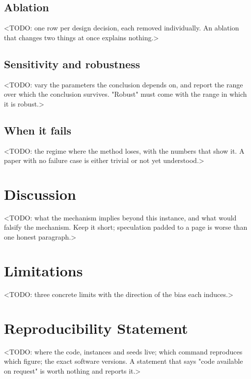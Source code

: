 \documentclass[10pt]{article}
\begin{document}
\subsection{Ablation}
<TODO: one row per design decision, each removed individually. An ablation that
changes two things at once explains nothing.>

\subsection{Sensitivity and robustness}
<TODO: vary the parameters the conclusion depends on, and report the range over
which the conclusion survives. "Robust" must come with the range in which it is
robust.>

\subsection{When it fails}
<TODO: the regime where the method loses, with the numbers that show it. A paper
with no failure case is either trivial or not yet understood.>

\section{Discussion}
<TODO: what the mechanism implies beyond this instance, and what would falsify the
mechanism. Keep it short; speculation padded to a page is worse than one honest
paragraph.>

\section{Limitations}
<TODO: three concrete limits with the direction of the bias each induces.>

\section*{Reproducibility Statement}
<TODO: where the code, instances and seeds live; which command reproduces which
figure; the exact software versions. A statement that says "code available on
request" is worth nothing and  reports it.>
\end{document}
